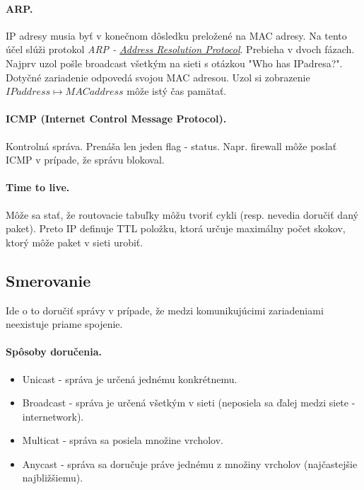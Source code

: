 \documentclass[10pt,a4paper]{article}
\begin{document}
\paragraph{ARP.}
IP adresy musia byť v konečnom dôsledku preložené na MAC adresy. Na tento účel slúži protokol \emph{ARP - \href{http://en.wikipedia.org/wiki/Address\_Resolution\_Protocol}{Address Resolution Protocol}}. Prebieha v dvoch fázach. Najprv uzol pošle broadcast všetkým na sieti s otázkou "Who has IPadresa?". Dotyčné zariadenie odpovedá svojou MAC adresou. Uzol si zobrazenie $IPaddress \mapsto MACaddress$ môže istý čas pamätať.  

\paragraph{ICMP (Internet Control Message Protocol).}
Kontrolná správa. Prenáša len jeden flag - status. Napr. firewall môže poslať ICMP v prípade, že správu blokoval. 

\paragraph{Time to live.}
Môže sa stať, že routovacie tabuľky môžu tvoriť cykli (resp. nevedia doručiť daný paket).
Preto IP definuje TTL položku, ktorá určuje maximálny počet skokov, ktorý môže paket v sieti urobiť. 
           
\subsection{Smerovanie}         
\label{routing}

Ide o to doručiť správy v prípade, že medzi komunikujúcimi zariadeniami neexistuje priame spojenie. 

\paragraph{Spôsoby doručenia.}
\begin{itemize}
\item Unicast - správa je určená jednému konkrétnemu.         
\item Broadcast - správa je určená všetkým v sieti (neposiela sa ďalej medzi siete - internetwork).
\item Multicat - správa sa posiela množine vrcholov. 
\item Anycast - správa sa doručuje práve jednému z množiny vrcholov (najčastejšie najbližšiemu).
\end{itemize}                               
                
\end{document}
